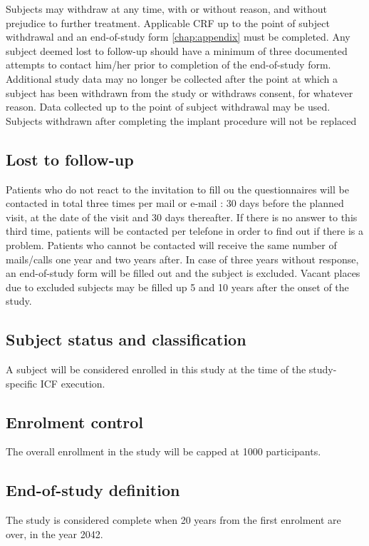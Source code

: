 Subjects may withdraw at any time, with or without reason, and without prejudice to further treatment. Applicable \ac{CRF} up to the point of subject withdrawal and an end-of-study form \ref{chap:appendix} must be completed. Any subject deemed lost to follow-up should have a minimum of three documented attempts to contact him/her prior to completion of the end-of-study form. Additional study data may no longer be collected after the point at which a subject has been withdrawn from the study or withdraws consent, for whatever reason. Data collected up to the point of subject withdrawal may be used. Subjects withdrawn after completing the implant procedure will not be replaced 

\subsection{Lost to follow-up}
Patients who do not react to the invitation to fill ou the questionnaires will be contacted in total three times per mail or e-mail : 30 days before the planned visit, at the date of the visit and 30 days thereafter. If there is no answer to this third time, patients will be contacted per telefone in order to find out if there is a problem. Patients who cannot be contacted will receive the same number of mails/calls one year and two years after. In case of three years without response, an end-of-study form will be filled out and the subject is excluded. Vacant places due to excluded subjects may be filled up 5 and 10 years after the onset of the study.

\subsection{Subject status and classification}
A subject will be considered enrolled in this study at the time of the study-specific \ac{ICF} execution.

\subsection{Enrolment control}
The overall enrollment in the study will be capped at \num[round-precision = 0, round-mode = places]{1000} participants.

\subsection{End-of-study definition}
The study is considered complete when 20 years from the first enrolment are over, in the year 2042.

